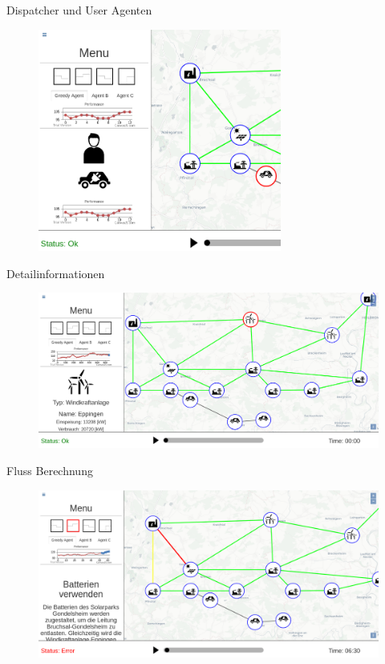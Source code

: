 \documentclass[22pt]{beamer}
\begin{document}
\begin{frame}{Dispatcher und User Agenten}
    \begin{figure}[!h]
      \centering
      \includegraphics[width=80mm]{resources/enduser.png}
      \label{fig:projectplan}
    \end{figure}
  \end{frame}
  \begin{frame}{Detailinformationen}
    \begin{figure}[!h]
      \centering
      \includegraphics[width=115mm]{resources/selected.png}
      \label{fig:projectplan}
    \end{figure}
\end{frame}

\begin{frame}{Fluss Berechnung}
    \begin{figure}[!h]
      \centering
      \includegraphics[width=115mm]{resources/action.png}
      \label{fig:projectplan}
    \end{figure}
  \end{frame}
  
\end{document}
